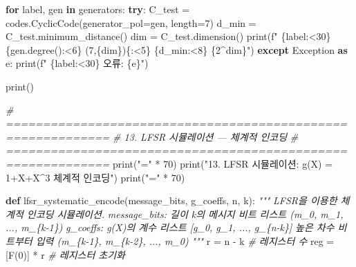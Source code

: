 \documentclass[
  oneside]{article}
\newenvironment{Shaded}{}{}
\newcommand{\BuiltInTok}[1]{\textcolor[rgb]{0.00,0.50,0.00}{#1}}
\newcommand{\CommentTok}[1]{\textcolor[rgb]{0.38,0.63,0.69}{\textit{#1}}}
\newcommand{\ControlFlowTok}[1]{\textcolor[rgb]{0.00,0.44,0.13}{\textbf{#1}}}
\newcommand{\DecValTok}[1]{\textcolor[rgb]{0.25,0.63,0.44}{#1}}
\newcommand{\ImportTok}[1]{\textcolor[rgb]{0.00,0.50,0.00}{\textbf{#1}}}
\newcommand{\KeywordTok}[1]{\textcolor[rgb]{0.00,0.44,0.13}{\textbf{#1}}}
\newcommand{\NormalTok}[1]{#1}
\newcommand{\OperatorTok}[1]{\textcolor[rgb]{0.40,0.40,0.40}{#1}}
\newcommand{\PreprocessorTok}[1]{\textcolor[rgb]{0.74,0.48,0.00}{#1}}
\newcommand{\SpecialCharTok}[1]{\textcolor[rgb]{0.25,0.44,0.63}{#1}}
\newcommand{\SpecialStringTok}[1]{\textcolor[rgb]{0.73,0.40,0.53}{#1}}
\newcommand{\StringTok}[1]{\textcolor[rgb]{0.25,0.44,0.63}{#1}}
\begin{document}
\begin{Shaded}
\begin{Highlighting}[]
\ControlFlowTok{for}\NormalTok{ label, gen }\KeywordTok{in}\NormalTok{ generators:}
    \ControlFlowTok{try}\NormalTok{:}
\NormalTok{        C\_test }\OperatorTok{=}\NormalTok{ codes.CyclicCode(generator\_pol}\OperatorTok{=}\NormalTok{gen, length}\OperatorTok{=}\DecValTok{7}\NormalTok{)}
\NormalTok{        d\_min }\OperatorTok{=}\NormalTok{ C\_test.minimum\_distance()}
\NormalTok{        dim }\OperatorTok{=}\NormalTok{ C\_test.dimension()}
        \BuiltInTok{print}\NormalTok{(}\SpecialStringTok{f"  }\SpecialCharTok{\{}\NormalTok{label}\SpecialCharTok{:\textless{}30\}}\SpecialStringTok{ }\SpecialCharTok{\{}\NormalTok{gen}\SpecialCharTok{.}\NormalTok{degree()}\SpecialCharTok{:\textless{}6\}}\SpecialStringTok{ (7,}\SpecialCharTok{\{}\NormalTok{dim}\SpecialCharTok{\}}\SpecialStringTok{)}\SpecialCharTok{\{}\StringTok{\textquotesingle{}\textquotesingle{}}\SpecialCharTok{:\textless{}5\}}\SpecialStringTok{ }\SpecialCharTok{\{}\NormalTok{d\_min}\SpecialCharTok{:\textless{}8\}}\SpecialStringTok{ }\SpecialCharTok{\{}\DecValTok{2}\OperatorTok{\^{}}\NormalTok{dim}\SpecialCharTok{\}}\SpecialStringTok{"}\NormalTok{)}
    \ControlFlowTok{except} \PreprocessorTok{Exception} \ImportTok{as}\NormalTok{ e:}
        \BuiltInTok{print}\NormalTok{(}\SpecialStringTok{f"  }\SpecialCharTok{\{}\NormalTok{label}\SpecialCharTok{:\textless{}30\}}\SpecialStringTok{ 오류: }\SpecialCharTok{\{}\NormalTok{e}\SpecialCharTok{\}}\SpecialStringTok{"}\NormalTok{)}

\BuiltInTok{print}\NormalTok{()}

\CommentTok{\# ============================================================}
\CommentTok{\# 13. LFSR 시뮬레이션 — 체계적 인코딩}
\CommentTok{\# ============================================================}
\BuiltInTok{print}\NormalTok{(}\StringTok{"="} \OperatorTok{*} \DecValTok{70}\NormalTok{)}
\BuiltInTok{print}\NormalTok{(}\StringTok{"13. LFSR 시뮬레이션: g(X) = 1+X+X\^{}3 체계적 인코딩"}\NormalTok{)}
\BuiltInTok{print}\NormalTok{(}\StringTok{"="} \OperatorTok{*} \DecValTok{70}\NormalTok{)}

\KeywordTok{def}\NormalTok{ lfsr\_systematic\_encode(message\_bits, g\_coeffs, n, k):}
    \CommentTok{"""}
\CommentTok{    LFSR을 이용한 체계적 인코딩 시뮬레이션.}
\CommentTok{    message\_bits: 길이 k의 메시지 비트 리스트 (m\_0, m\_1, ..., m\_\{k{-}1\})}
\CommentTok{    g\_coeffs: g(X)의 계수 리스트 [g\_0, g\_1, ..., g\_\{n{-}k\}]}
\CommentTok{    높은 차수 비트부터 입력 (m\_\{k{-}1\}, m\_\{k{-}2\}, ..., m\_0)}
\CommentTok{    """}
\NormalTok{    r }\OperatorTok{=}\NormalTok{ n }\OperatorTok{{-}}\NormalTok{ k  }\CommentTok{\# 레지스터 수}
\NormalTok{    reg }\OperatorTok{=}\NormalTok{ [F(}\DecValTok{0}\NormalTok{)] }\OperatorTok{*}\NormalTok{ r  }\CommentTok{\# 레지스터 초기화}


\end{Highlighting}
\end{Shaded}
\end{document}
